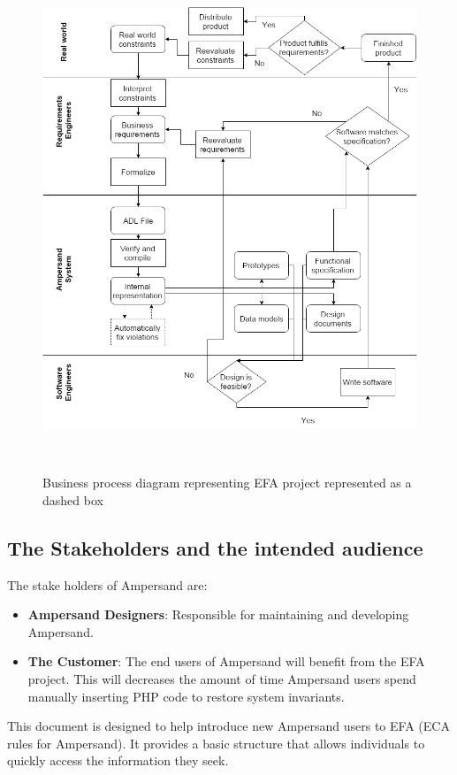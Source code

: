 \begin{figure}[!htb]
\begin{center}
\includegraphics[width=\textwidth]{../figures/business_process}
\caption{Business process diagram representing EFA project represented as a dashed box}~\label{fig:EFAproject}
\end{center}
\end{figure}

 \subsection{The Stakeholders and the intended audience}\label{sec:Stakeholders}
The stake holders of Ampersand are:

\begin{itemize}
	\item \textbf{Ampersand Designers}: Responsible for maintaining and developing Ampersand.
	\item \textbf{The Customer}: The end users of Ampersand will benefit from the EFA project. This will decreases the amount of time 
Ampersand users spend manually inserting PHP code to restore system invariants. 
\end{itemize}

This document is designed to help introduce new Ampersand users to EFA 
(ECA rules for Ampersand). It provides a basic structure that allows 
individuals to quickly access the information they seek. 

